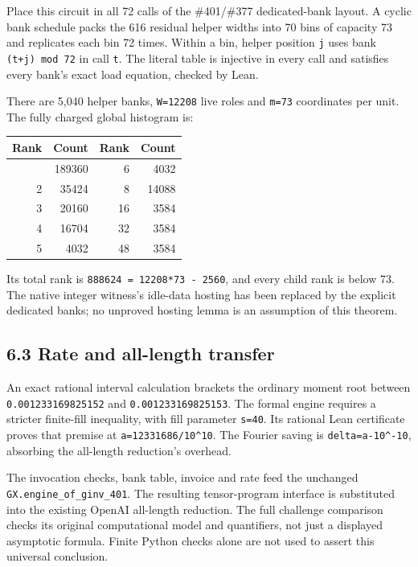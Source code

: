\documentclass[
  11pt,
]{article}
\newcounter{none} %
\begin{document}
Place this circuit in all 72 calls of the \#401/\#377 dedicated-bank
layout. A cyclic bank schedule packs the 616 residual helper widths into
70 bins of capacity 73 and replicates each bin 72 times. Within a bin,
helper position \texttt{j} uses bank \texttt{(t+j)\ mod\ 72} in call
\texttt{t}. The literal table is injective in every call and satisfies
every bank's exact load equation, checked by Lean.

There are 5,040 helper banks, \texttt{W=12208} live roles and
\texttt{m=73} coordinates per unit. The fully charged global histogram
is:

{\def\LTcaptype{none} %
\begin{longtable}[]{@{}rrrr@{}}
\toprule\noalign{}
Rank & Count & Rank & Count \\
\midrule\noalign{}
\endhead
\bottomrule\noalign{}
\endlastfoot
1 & 189360 & 6 & 4032 \\
2 & 35424 & 8 & 14088 \\
3 & 20160 & 16 & 3584 \\
4 & 16704 & 32 & 3584 \\
5 & 4032 & 48 & 3584 \\
\end{longtable}
}

Its total rank is \texttt{888624\ =\ 12208*73\ -\ 2560}, and every child
rank is below 73. The native integer witness's idle-data hosting has
been replaced by the explicit dedicated banks; no unproved hosting lemma
is an assumption of this theorem.

\subsection{6.3 Rate and all-length
transfer}\label{rate-and-all-length-transfer}

An exact rational interval calculation brackets the ordinary moment root
between \texttt{0.001233169825152} and \texttt{0.001233169825153}. The
formal engine requires a stricter finite-fill inequality, with fill
parameter \texttt{s=40}. Its rational Lean certificate proves that
premise at \texttt{a=12331686/10\^{}10}. The Fourier saving is
\texttt{delta=a-10\^{}-10}, absorbing the all-length reduction's
overhead.

The invocation checks, bank table, invoice and rate feed the unchanged
\texttt{GX.engine\_of\_ginv\_401}. The resulting tensor-program
interface is substituted into the existing OpenAI all-length reduction.
The full challenge comparison checks its original computational model
and quantifiers, not just a displayed asymptotic formula. Finite Python
checks alone are not used to assert this universal conclusion.
\end{document}
